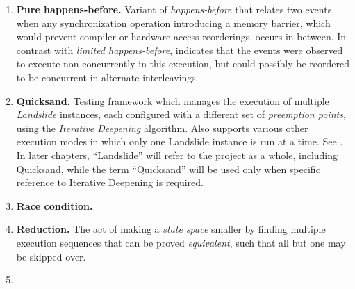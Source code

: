 \begin{enumerate}
	\item {\bf Pure happens-before.}
		Variant of {\em happens-before} that relates two events when any synchronization operation introducing a memory
		barrier, which would prevent compiler or hardware access reorderings, occurs in between.
		In contrast with {\em limited happens-before},
		indicates that the events were observed to execute non-concurrently in this execution,
		but could possibly be reordered to be concurrent in alternate interleavings.
	\item {\bf Quicksand.}
		Testing framework which manages the execution of multiple {\em Landslide} instances,
		each configured with a different set of {\em preemption points},
		using the {\em Iterative Deepening} algorithm.
		Also supports various other execution modes in which only one Landslide instance is run at a time.
		See .
		In later chapters, ``Landslide'' will refer to the project as a whole, including Quicksand,
		while the term ``Quicksand'' will be used only when specific reference to Iterative Deepening is required.
	\item {\bf Race condition.}
	\item {\bf Reduction.}
		The act of making a {\em state space} smaller by finding multiple execution sequences
		that can be proved {\em equivalent},
		such that all but one may be skipped over.
	\item {}
\end{enumerate}

